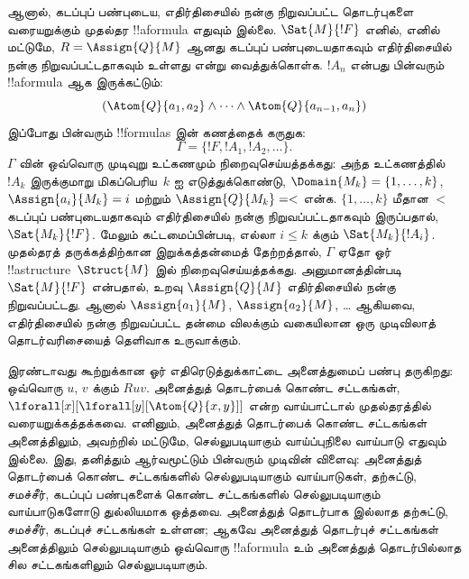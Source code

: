 \documentclass[../../../include/open-logic-section]{subfiles}
\begin{document}
ஆனால், கடப்புப் பண்புடைய, எதிர்திசையில் நன்கு நிறுவப்பட்ட தொடர்புகளை
வரையறுக்கும் முதல்தர !!a{formula} எதுவும் இல்லை. $\Sat{M}{!F}$ எனில்,
எனில் மட்டுமே, $R = \Assign{Q}{M}$ ஆனது கடப்புப் பண்புடையதாகவும்
எதிர்திசையில் நன்கு நிறுவப்பட்டதாகவும் உள்ளது என்று வைத்துக்கொள்க.
$!A_n$ என்பது பின்வரும் !!a{formula} ஆக இருக்கட்டும்:
\[
(\Atom{Q}{a_1,a_2} \land \dots \land
    \Atom{Q}{a_{n-1},a_{n}})
\]
இப்போது பின்வரும் !!{formula}s இன் கணத்தைக் கருதுக:
\[
\Gamma = \{!F, !A_1, !A_2, \dots\}.
\]
$\Gamma$ வின் ஒவ்வொரு முடிவுறு உட்கணமும் நிறைவுசெய்யத்தக்கது: அந்த
உட்கணத்தில் $!A_k$ இருக்குமாறு மிகப்பெரிய~$k$ ஐ எடுத்துக்கொண்டு,
$\Domain{M_k} = \{1, \dots, k\}$, $\Assign{a_i}{M_k} = i$ மற்றும்
$\Assign{Q}{M_k} = <$ என்க. $\{1, \dots, k\}$ மீதான $<$ கடப்புப்
பண்புடையதாகவும் எதிர்திசையில் நன்கு நிறுவப்பட்டதாகவும் இருப்பதால்,
$\Sat{M_k}{!F}$. மேலும் கட்டமைப்பின்படி, எல்லா $i \le k$ க்கும்
$\Sat{M_k}{!A_i}$. முதல்தரத் தருக்கத்திற்கான இறுக்கத்தன்மைத் தேற்றத்தால்,
$\Gamma$ ஏதோ ஓர் !!a{structure}~$\Struct{M}$ இல் நிறைவுசெய்யத்தக்கது.
அனுமானத்தின்படி $\Sat{M}{!F}$ என்பதால், உறவு $\Assign{Q}{M}$ எதிர்திசையில்
நன்கு நிறுவப்பட்டது. ஆனால் $\Assign{a_1}{M}$, $\Assign{a_2}{M}$, \dots{}
ஆகியவை, எதிர்திசையில் நன்கு நிறுவப்பட்ட தன்மை விலக்கும் வகையிலான ஒரு
முடிவிலாத் தொடர்வரிசையைத் தெளிவாக உருவாக்கும்.

இரண்டாவது கூற்றுக்கான ஓர் எதிரெடுத்துக்காட்டை அனைத்துமைப் பண்பு தருகிறது:
ஒவ்வொரு $u$, $v$ க்கும் $Ruv$. அனைத்துத் தொடர்பைக் கொண்ட சட்டகங்கள்,
$\lforall[x][\lforall[y][\Atom{Q}{x,y}]]$ என்ற வாய்பாட்டால் முதல்தரத்தில்
வரையறுக்கத்தக்கவை. எனினும், அனைத்துத் தொடர்பைக் கொண்ட சட்டகங்கள் அனைத்திலும்,
அவற்றில் மட்டுமே, செல்லுபடியாகும் வாய்ப்புநிலை வாய்பாடு எதுவும் இல்லை. இது,
தனித்தும் ஆர்வமூட்டும் பின்வரும் முடிவின் விளைவு: அனைத்துத் தொடர்பைக் கொண்ட
சட்டகங்களில் செல்லுபடியாகும் வாய்பாடுகள், தற்சுட்டு, சமச்சீர், கடப்புப்
பண்புகளைக் கொண்ட சட்டகங்களில் செல்லுபடியாகும் வாய்பாடுகளோடு துல்லியமாக
ஒத்தவை. அனைத்துத் தொடர்பாக இல்லாத தற்சுட்டு, சமச்சீர், கடப்புச் சட்டகங்கள்
உள்ளன; ஆகவே அனைத்துத் தொடர்புச் சட்டகங்கள் அனைத்திலும் செல்லுபடியாகும்
ஒவ்வொரு !!a{formula} உம் அனைத்துத் தொடர்பில்லாத சில சட்டகங்களிலும்
செல்லுபடியாகும்.
\end{document}
